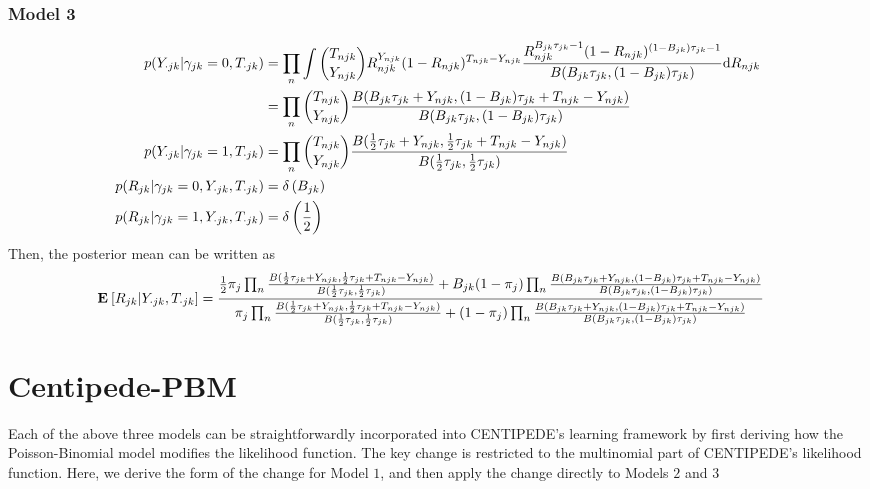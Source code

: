 \documentclass[reqno]{amsart}
\numberwithin{equation}{section}
\begin{document}
\subsubsection{Model 3}
\begin{align}
    p(Y_{\cdot jk} | \gamma_{jk} =0, T_{\cdot jk}) 
       &= \prod_{n} \int {T_{njk} \choose Y_{njk}} R_{njk}^{Y_{njk}} (1-R_{njk})^{T_{njk}-Y_{njk}} \frac{R_{njk}^{B_{jk}\tau_{jk} -1} (1-R_{njk})^{(1-B_{jk})\tau_{jk} -1}}{ B(B_{jk}\tau_{jk},(1-B_{jk})\tau_{jk})}   \mathrm{d}R_{njk} \\
       &=  \prod_{n} {T_{njk} \choose Y_{njk}} \frac{B(B_{jk}\tau_{jk} +  Y_{njk}   ,  (1-B_{jk})\tau_{jk} +   T_{njk}-Y_{njk} )} {B(B_{jk}\tau_{jk},(1-B_{jk})\tau_{jk})}\\
    p(Y_{\cdot jk} | \gamma_{jk} =1, T_{\cdot jk})
      &=  \prod_{n} {T_{njk} \choose Y_{njk}} \frac{B(\frac{1}{2}\tau_{jk} +  Y_{njk}   ,  \frac{1}{2}\tau_{jk} +   T_{njk}-Y_{njk} )} {B(\frac{1}{2}\tau_{jk},\frac{1}{2}\tau_{jk})}\\
    p(R_{jk}  | \gamma_{jk} =0, Y_{\cdot jk}, T_{\cdot jk}) &=  \delta \left(B_{jk} \right)\\
    p(R_{jk}  | \gamma_{jk} =1, Y_{\cdot jk}, T_{\cdot jk}) &=  \delta \left(\frac{1}{2} \right)
\end{align}
Then, the posterior mean can be written as
\begin{align}
      \mathbf{E}_{}\left[R_{jk} | Y_{\cdot jk}, T_{\cdot jk}\right]
      &=  \frac{  \frac{1}{2}\pi_j \prod_{n} \frac{B(\frac{1}{2}\tau_{jk} +  Y_{njk}   ,  \frac{1}{2}\tau_{jk} +   T_{njk}-Y_{njk} )} {B(\frac{1}{2}\tau_{jk},\frac{1}{2}\tau_{jk})}   + B_{jk}(1-\pi_j) \prod_{n} \frac{B(B_{jk}\tau_{jk} +  Y_{njk}   ,  (1-B_{jk})\tau_{jk} +   T_{njk}-Y_{njk} )} {B(B_{jk}\tau_{jk},(1-B_{jk})\tau_{jk})}}{  \pi_j \prod_{n} \frac{B(\frac{1}{2}\tau_{jk} +  Y_{njk}   ,  \frac{1}{2}\tau_{jk} +   T_{njk}-Y_{njk} )} {B(\frac{1}{2}\tau_{jk},\frac{1}{2}\tau_{jk})}   + (1-\pi_j) \prod_{n} \frac{B(B_{jk}\tau_{jk} +  Y_{njk}   ,  (1-B_{jk})\tau_{jk} +   T_{njk}-Y_{njk} )} {B(B_{jk}\tau_{jk},(1-B_{jk})\tau_{jk})}}
\end{align}


\section{Centipede-PBM}

Each of the above three models can be straightforwardly incorporated into CENTIPEDE's learning framework by first deriving 
how the Poisson-Binomial model modifies the likelihood function. The key change is restricted to the multinomial part
of CENTIPEDE's likelihood function. Here, we derive the form of the change for Model $1$, and then apply the change
directly to Models $2$ and $3$ 
\end{document}
